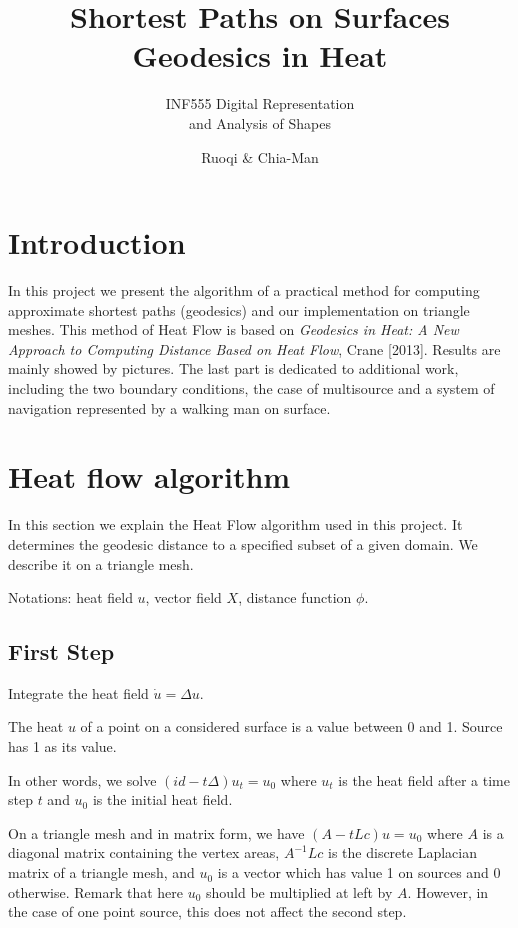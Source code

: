 \documentclass[a4paper,12pt,twoside]{article}
\title{Shortest Paths on Surfaces\\ Geodesics in Heat}
\subtitle{INF555 Digital Representation\\ and Analysis of Shapes }
\author{Ruoqi \bsc{He} \& Chia-Man \bsc{Hung}}
\begin{document}
\maketitle

\section{Introduction}

In this project we present the algorithm of a practical method for computing approximate shortest paths (geodesics) and our implementation on triangle meshes. This method of Heat Flow is based on \textit{Geodesics in Heat: A New Approach to Computing Distance Based on Heat Flow}, Crane [2013]. Results are mainly showed by pictures. The last part is dedicated to additional work, including the two boundary conditions, the case of multisource and a system of navigation represented by a walking man on surface.

\section{Heat flow algorithm}

In this section we explain the Heat Flow algorithm used in this project. It determines the geodesic distance to a specified subset of a given domain. We describe it on a triangle mesh.

Notations: heat field $u$, vector field $X$, distance function $\phi$.

\subsection{First Step}
Integrate the heat field $\dot{u} = \Delta u$.

The heat $u$ of a point on a considered surface is a value between 0 and 1. Source has 1 as its value.

In other words, we solve $(id - t\Delta)u_t = u_0$ where $u_t$ is the heat field after a time step $t$ and $u_0$ is the initial heat field.

On a triangle mesh and in matrix form, we have $(A - tLc)u = u_0$ where $A$ is a diagonal matrix containing the vertex areas, $A^{-1}Lc$ is the discrete Laplacian matrix of a triangle mesh, and $u_0$ is a vector which has value 1 on sources and 0 otherwise. Remark that here $u_0$ should be multiplied at left by $A$. However, in the case of one point source, this does not affect the second step.
\end{document}
